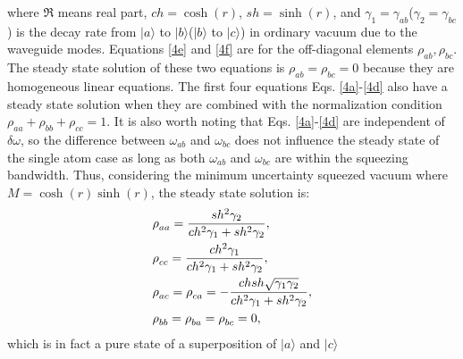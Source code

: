\documentclass[aps,showpacs,twocolumn,twoside,groupedaddress]{revtex4}
\begin{document}
where $\Re$ means real part, $ch=\cosh(r)$, $sh=\sinh(r)$, and $\gamma_{1}=\gamma_{ab}$($\gamma_{2}=\gamma_{bc}$) is the decay rate from $|a\rangle$ to $|b\rangle$($|b\rangle$ to $|c\rangle$) in ordinary vacuum due to the waveguide modes. Equations \eqref{4e} and \eqref{4f} are for the off-diagonal elements $\rho_{ab}, \rho_{bc}$. The steady state solution of these two equations is $\rho_{ab}=\rho_{bc}=0$ because they are homogeneous linear equations. The first four equations Eqs.  \eqref{4a}-\eqref{4d} also have a steady state solution when they are combined with the normalization condition $\rho_{aa}+\rho_{bb}+\rho_{cc}=1$. It is also worth noting that Eqs. \eqref{4a}-\eqref{4d} are independent of $\delta\omega$, so the difference between $\omega_{ab}$ and $\omega_{bc}$ does not influence the steady state of the single atom case as long as both $\omega_{ab}$ and $\omega_{bc}$ are within the squeezing bandwidth. Thus, considering the minimum uncertainty squeezed vacuum where $M=\cosh(r)\sinh(r)$, the steady state solution is:
\begin{equation}
\label{eq2}
\begin{split}
& \text{\ensuremath{\rho}}_{aa}=\frac{sh^{2}\gamma_{2}}{ch^{2}\gamma_{1}+sh^{2}\gamma_{2}}, \\
& \text{\ensuremath{\rho}}_{cc}=\frac{ch^{2}\gamma_{1}}{ch^{2}\gamma_{1}+sh^{2}\gamma_{2}},\\
& \text{\ensuremath{\rho}}_{ac}=\text{\ensuremath{\rho}}_{ca}=-\frac{chsh\sqrt{\gamma_{1}\gamma_{2}}}{ch^{2}\gamma_{1}+sh^{2}\gamma_{2}},\\
& \text{\ensuremath{\rho}}_{bb}=\text{\ensuremath{\rho}}_{ba}=\text{\ensuremath{\rho}}_{bc}=0,
\end{split}
\end{equation}
which is in fact a pure state of a superposition of $|a\rangle$ and $|c\rangle$
\end{document}
